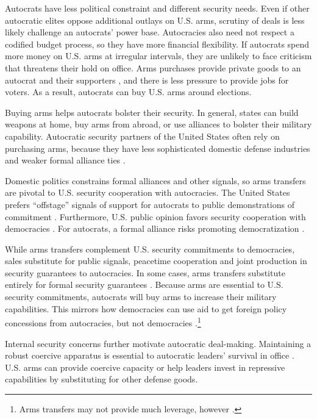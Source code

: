\documentclass[12pt]{article}
\begin{document}
Autocrats have less political constraint and different security needs.
Even if other autocratic elites oppose additional outlays on U.S. arms, scrutiny of deals is less likely challenge an autocrats' power base. 
Autocracies also need not respect a codified budget process, so they have more financial flexibility.
If autocrats spend more money on U.S. arms at irregular intervals, they are unlikely to face criticism that threatens their hold on office. 
Arms purchases provide private goods to an autocrat and their supporters \citep{BDMetal2002}, and there is less pressure to provide jobs for voters. 
As a result, autocrats can buy U.S. arms around elections.   


Buying arms helps autocrats bolster their security.
In general, states can build weapons at home, buy arms from abroad, or use alliances to bolster their military capability. 
Autocratic security partners of the United States often rely on purchasing arms, because they have less sophisticated domestic defense industries \citep{Bitzinger2003} and weaker formal alliance ties \citep{Yarhi-Miloetal2016}. 


Domestic politics constrains formal alliances and other signals, so arms transfers are pivotal to U.S. security cooperation with autocracies.  
The United States prefers ``offstage'' signals of support for autocrats to public demonstrations of commitment \citep{McManusYarhi-Milo2017}.
Furthermore, U.S. public opinion favors security cooperation with democracies \citep{Alley2023}. 
For autocrats, a formal alliance risks promoting democratization \citep{GiblerWolford2006}.


While arms transfers complement U.S. security commitments to democracies, sales substitute for public signals, peacetime cooperation and joint production in security guarantees to autocracies.
In some cases, arms transfers substitute entirely for formal security guarantees \citep{Yarhi-Miloetal2016}. 
Because arms are essential to U.S. security commitments, autocrats will buy arms to increase their military capabilities.
This mirrors how democracies can use aid to get foreign policy concessions from autocracies, but not democracies \citep{BDMSmith2009}.\footnote{Arms transfers may not provide much leverage, however \citep{Spindel2023}.}


Internal security concerns further motivate autocratic deal-making. 
Maintaining a robust coercive apparatus is essential to autocratic leaders' survival in office \citep{Boix2008}. 
U.S. arms can provide coercive capacity or help leaders invest in repressive capabilities by substituting for other defense goods. 
\end{document}
